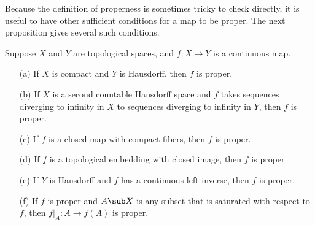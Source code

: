 Because the definition of properness is sometimes tricky to check directly, it is useful to have other sufficient conditions for a map to be proper. The next proposition gives several such conditions.
\begin{proposition}\label{proper map if}
Suppose $X$ and $Y$ are topological spaces, and $f:X\to Y$ is a continuous map.
\begin{itemize}
\item[(a)] If $X$ is compact and $Y$ is Hausdorff, then $f$ is proper.
\item[(b)] If $X$ is a second countable Hausdorff space and $f$ takes sequences diverging
to infinity in $X$ to sequences diverging to infinity in $Y$, then $f$ is proper. 
\item[(c)] If $f$ is a closed map with compact fibers, then $f$ is proper.
\item[(d)] If $f$ is a topological embedding with closed image, then $f$ is proper.
\item[(e)] If $Y$ is Hausdorff and $f$ has a continuous left inverse, then $f$ is proper.
\item[(f)] If $f$ is proper and $A\sub X$ is any subset that is saturated with respect to $f$, then $f|_A:A\to f(A)$ is proper.
\end{itemize}
\end{proposition}
